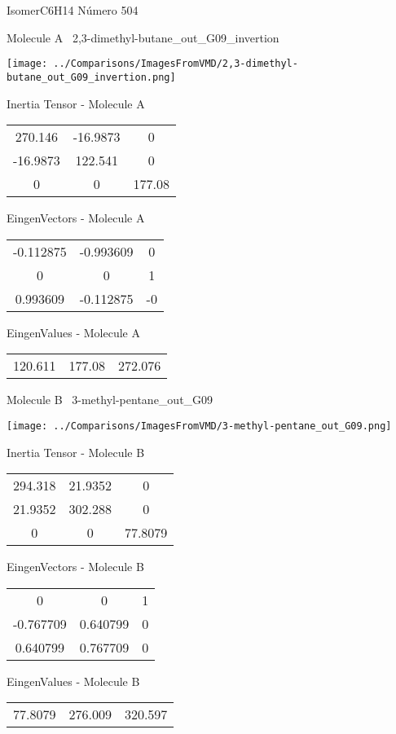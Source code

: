 \vtab[-3cm]
\begin{center}
{\large IsomerC6H14 \tab Número 504}
\end{center}
\begin{multicols}{2}
\begin{center}

Molecule A \
2,3-dimethyl-butane\_out\_G09\_invertion

\texttt{[image: ../Comparisons/ImagesFromVMD/2,3-dimethyl-butane\_out\_G09\_invertion.png]}

Inertia Tensor - Molecule A \\
\begin{tabular}{|c c c|}
270.146	 & 	-16.9873	 & 	0	 \\
-16.9873	 & 	122.541	 & 	0	 \\
0	 & 	0	 & 	177.08
\end{tabular}

\vtab
 EingenVectors - Molecule A     \\
\begin{tabular}{|c c c|}
-0.112875	 & 	-0.993609	 & 	0	 \\
0	 & 	0	 & 	1	 \\
0.993609	 & 	-0.112875	 & 	-0
\end{tabular}

\vtab
 EingenValues - Molecule A     \\
\begin{tabular}{|c c c|}
120.611	 & 	177.08	 & 	272.076	 \\
\end{tabular}
\columnbreak

Molecule B \
3-methyl-pentane\_out\_G09

\texttt{[image: ../Comparisons/ImagesFromVMD/3-methyl-pentane\_out\_G09.png]}

Inertia Tensor - Molecule B \\
\begin{tabular}{|c c c|}
294.318	 & 	21.9352	 & 	0	 \\
21.9352	 & 	302.288	 & 	0	 \\
0	 & 	0	 & 	77.8079
\end{tabular}

\vtab
 EingenVectors - Molecule B     \\
\begin{tabular}{|c c c|}
0	 & 	0	 & 	1	 \\
-0.767709	 & 	0.640799	 & 	0	 \\
0.640799	 & 	0.767709	 & 	0
\end{tabular}

\vtab
 EingenValues - Molecule B     \\
\begin{tabular}{|c c c|}
77.8079	 & 	276.009	 & 	320.597	 \\
\end{tabular}

\end{center}
\end{multicols}

